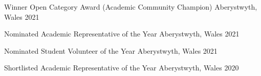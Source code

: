 



\begin{cvhonors}

  \cvhonor
    {Winner} %
    {Open Category Award (Academic Community Champion)} %
    {Aberystwyth, Wales} %
    {2021} %
  
  \cvhonor
    {Nominated} %
    {Academic Representative of the Year} %
    {Aberystwyth, Wales} %
    {2021} %

  \cvhonor
    {Nominated} %
    {Student Volunteer of the Year} %
    {Aberystwyth, Wales} %
    {2021} %

  \cvhonor
    {Shortlisted} %
    {Academic Representative of the Year} %
    {Aberystwyth, Wales} %
    {2020} %

\end{cvhonors}
